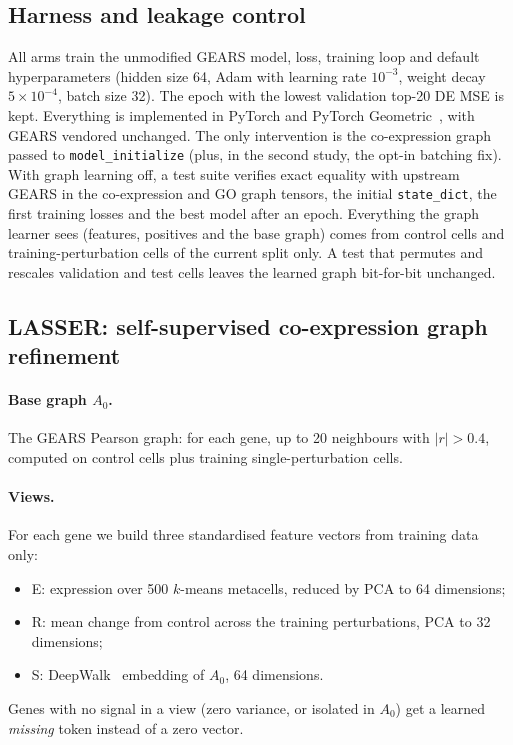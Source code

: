 \documentclass[11pt]{article}
\newcommand{\GEARS}{\textsc{GEARS}}
\begin{document}
\subsection{Harness and leakage control}
All arms train the unmodified \GEARS{} model, loss, training loop and default hyperparameters (hidden size 64,
Adam with learning rate $10^{-3}$, weight decay $5{\times}10^{-4}$, batch size 32). The epoch with the lowest
validation top-20 DE MSE is kept. Everything is implemented in PyTorch and PyTorch Geometric~\cite{fey2019pyg}, with \GEARS{} vendored unchanged.
The only intervention is the co-expression graph passed to
\texttt{model\_initialize} (plus, in the second study, the opt-in batching fix). With graph learning off, a test
suite verifies exact equality with upstream \GEARS{} in the co-expression and GO graph tensors, the initial
\texttt{state\_dict}, the first training losses and the best model after an epoch. Everything the graph learner
sees (features, positives and the base graph) comes from control cells and training-perturbation cells of the
current split only. A test that permutes and rescales validation and test cells leaves the learned graph
bit-for-bit unchanged.

\subsection{LASSER: self-supervised co-expression graph refinement}
\paragraph{Base graph $A_0$.} The \GEARS{} Pearson graph: for each gene, up to 20 neighbours with $|r|>0.4$,
computed on control cells plus training single-perturbation cells.

\paragraph{Views.} For each gene we build three standardised feature vectors from training data only:
\begin{itemize}
  \item E: expression over 500 $k$-means metacells, reduced by PCA to 64 dimensions;
  \item R: mean change from control across the training perturbations, PCA to 32 dimensions;
  \item S: DeepWalk~\cite{perozzi2014deepwalk} embedding of $A_0$, 64 dimensions.
\end{itemize}
Genes with no signal in a view (zero variance, or isolated in $A_0$) get a learned \emph{missing} token instead of
a zero vector.
\end{document}
